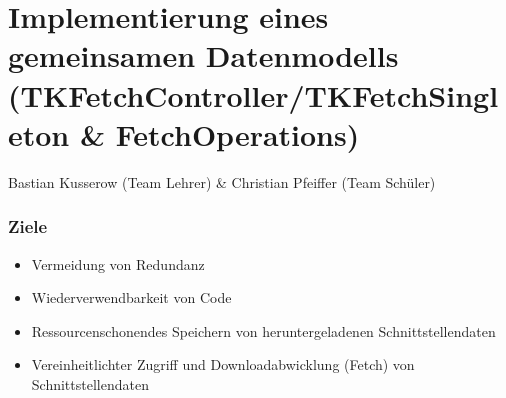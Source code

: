 \chapter{Implementierung eines gemeinsamen Datenmodells (TKFetchController/TKFetchSingleton \& FetchOperations)}
Bastian Kusserow (Team Lehrer) \& Christian Pfeiffer (Team Schüler)
\subsection{Ziele}


\begin{itemize}
\item Vermeidung von Redundanz
\item Wiederverwendbarkeit von Code
\item Ressourcenschonendes Speichern von heruntergeladenen Schnittstellendaten
\item Vereinheitlichter Zugriff und Downloadabwicklung (Fetch) von Schnittstellendaten
\end{itemize}


\subsection{}